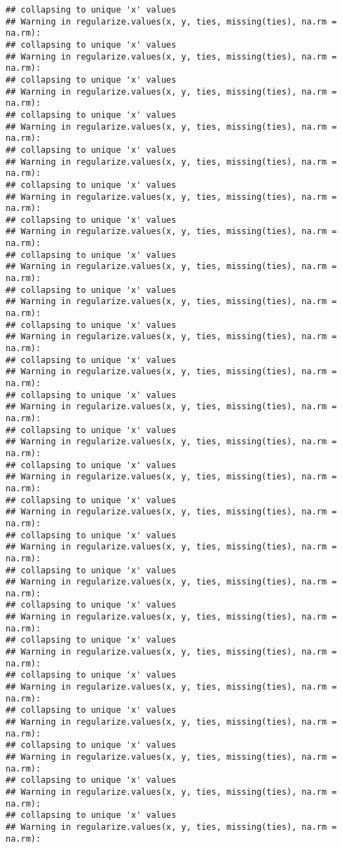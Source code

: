\documentclass[
]{article}
\begin{document}
\begin{verbatim}
## collapsing to unique 'x' values
## Warning in regularize.values(x, y, ties, missing(ties), na.rm = na.rm):
## collapsing to unique 'x' values
## Warning in regularize.values(x, y, ties, missing(ties), na.rm = na.rm):
## collapsing to unique 'x' values
## Warning in regularize.values(x, y, ties, missing(ties), na.rm = na.rm):
## collapsing to unique 'x' values
## Warning in regularize.values(x, y, ties, missing(ties), na.rm = na.rm):
## collapsing to unique 'x' values
## Warning in regularize.values(x, y, ties, missing(ties), na.rm = na.rm):
## collapsing to unique 'x' values
## Warning in regularize.values(x, y, ties, missing(ties), na.rm = na.rm):
## collapsing to unique 'x' values
## Warning in regularize.values(x, y, ties, missing(ties), na.rm = na.rm):
## collapsing to unique 'x' values
## Warning in regularize.values(x, y, ties, missing(ties), na.rm = na.rm):
## collapsing to unique 'x' values
## Warning in regularize.values(x, y, ties, missing(ties), na.rm = na.rm):
## collapsing to unique 'x' values
## Warning in regularize.values(x, y, ties, missing(ties), na.rm = na.rm):
## collapsing to unique 'x' values
## Warning in regularize.values(x, y, ties, missing(ties), na.rm = na.rm):
## collapsing to unique 'x' values
## Warning in regularize.values(x, y, ties, missing(ties), na.rm = na.rm):
## collapsing to unique 'x' values
## Warning in regularize.values(x, y, ties, missing(ties), na.rm = na.rm):
## collapsing to unique 'x' values
## Warning in regularize.values(x, y, ties, missing(ties), na.rm = na.rm):
## collapsing to unique 'x' values
## Warning in regularize.values(x, y, ties, missing(ties), na.rm = na.rm):
## collapsing to unique 'x' values
## Warning in regularize.values(x, y, ties, missing(ties), na.rm = na.rm):
## collapsing to unique 'x' values
## Warning in regularize.values(x, y, ties, missing(ties), na.rm = na.rm):
## collapsing to unique 'x' values
## Warning in regularize.values(x, y, ties, missing(ties), na.rm = na.rm):
## collapsing to unique 'x' values
## Warning in regularize.values(x, y, ties, missing(ties), na.rm = na.rm):
## collapsing to unique 'x' values
## Warning in regularize.values(x, y, ties, missing(ties), na.rm = na.rm):
## collapsing to unique 'x' values
## Warning in regularize.values(x, y, ties, missing(ties), na.rm = na.rm):
## collapsing to unique 'x' values
## Warning in regularize.values(x, y, ties, missing(ties), na.rm = na.rm):
## collapsing to unique 'x' values
## Warning in regularize.values(x, y, ties, missing(ties), na.rm = na.rm):
## collapsing to unique 'x' values
## Warning in regularize.values(x, y, ties, missing(ties), na.rm = na.rm):

\end{verbatim}
\end{document}
